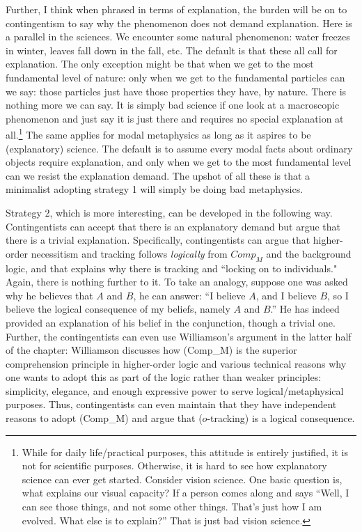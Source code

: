 Further, I think when phrased in terms of explanation, the burden will be on to contingentism to say why the phenomenon does not demand explanation. Here is a parallel in the sciences. We encounter some natural phenomenon: water freezes in winter, leaves fall down in the fall, etc. The default is that these all call for explanation. The only exception might be that when we get to the most fundamental level of nature:  only when we get to the fundamental particles can we say: those particles just have those properties they have, by nature. There is nothing more we can say. It is simply bad science if one look at a macroscopic phenomenon and just say it is just there and requires no special explanation at all.\footnote{While for daily life/practical purposes, this attitude is entirely justified, it is not for scientific purposes. Otherwise, it is hard to see how explanatory science can ever get started. Consider vision science. One basic question is, what explains our visual capacity? If a person comes along and says ``Well, I can see those things, and not some other things. That's just how I am evolved. What else is to explain?'' That is just bad vision science.}
 The same applies for modal metaphysics as long as it aspires to be (explanatory) science. The default is to assume every modal facts about ordinary objects require explanation, and only when we get to the most fundamental level can we resist the explanation demand. The upshot of all these is that a minimalist adopting strategy 1 will simply be doing bad metaphysics. 
 
Strategy 2, which is more interesting, can be developed in the following way. Contingentists can accept that there is an explanatory demand but argue that there is a trivial explanation. Specifically, contingentists can argue that higher-order necessitism and tracking follows \emph{logically} from $Comp_M$ and the background logic, and that explains why there is tracking and ``locking on to individuals." Again, there is nothing further to it. To take an analogy, suppose one was asked why he believes that $A$ and $B$, he can answer: ``I believe $A$, and I believe $B$, so I believe the logical consequence of my beliefs, namely $A$ and $B$.'' He has indeed provided an explanation of his belief in the conjunction, though a trivial one. Further, the contingentists can even use Williamson's argument in the latter half of the chapter: Williamson discusses how (Comp_M) is the superior comprehension principle in higher-order logic and various technical reasons why one wants to adopt this as part of the logic rather than weaker principles: simplicity, elegance, and enough expressive power to serve logical/metaphysical purposes. Thus, contingentists can even maintain that they have independent reasons to adopt (Comp_M) and argue that ($o$-tracking) is a logical consequence. 

